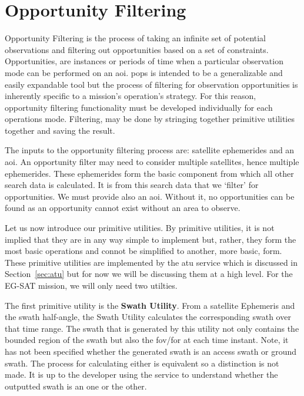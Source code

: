 \section{Opportunity Filtering} \label{sec:opp-filtering}

Opportunity Filtering is the process of taking an infinite set of potential
observations and filtering out opportunities based on a set of constraints.
Opportunities, are instances or periods of time when a particular observation
mode can be performed on an \gls{aoi}. \gls{pops} is intended to be a
generalizable and easily expandable tool but the process of filtering for
observation opportunities is inherently specific to a mission’s operation’s
strategy.  For this reason, opportunity filtering functionality must be
developed individually for each operations mode.  Filtering, may be done by
stringing together primitive utilities together and saving the result. 

The inputs to the opportunity filtering process are: satellite ephemerides and
an \gls{aoi}. An opportunity filter may need to consider multiple satellites,
hence multiple ephemerides. These ephemerides form the basic component from
which all other search data is calculated. It is from this search data that we
`filter' for opportunities. We must provide also an \gls{aoi}.  Without it, no
opportunities can be found as an opportunity cannot exist without an area to
observe.

Let us now introduce our primitive utilities. By primitive utilities, it is not
implied that they are in any way simple to implement but, rather, they form the
most basic operations and connot be simplified to another, more basic, form.
These primitive utilities are implemented by the \gls{atu} service which is
discussed in Section~\ref{sec:atu} but for now we will be discussing them at a
high level. For the EG-SAT mission, we will only need two utilties.

The first primitive utility is the \textbf{Swath Utility}. From a satellite
Ephemeris and the swath half-angle, the Swath Utility calculates the
corresponding swath over that time range. The swath that is generated by this
utility not only contains the bounded region of the swath but also the
\gls{fov}/\gls{for} at each time instant. Note, it has not been specified
whether the generated swath is an access swath or ground swath.  The process
for calculating either is equivalent so a distinction is not made.  It is up to
the developer using the service to understand whether the outputted swath is an
one or the other.

